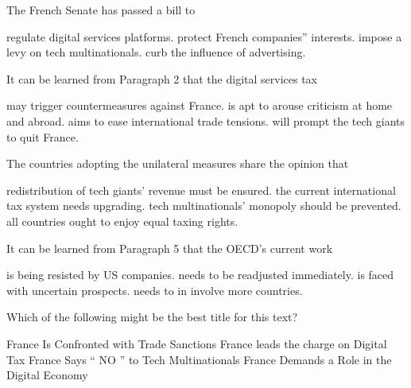 \item The French Senate has passed a bill to
\begin{tasks}
	\task regulate digital services platforms.
	\task protect French companies'' interests.
	\task impose a levy on tech multinationals.
	\task curb the influence of advertising.
\end{tasks}
\item It can be learned from Paragraph 2 that the digital services tax
\begin{tasks}
	\task may trigger countermeasures against France.
	\task is apt to arouse criticism at home and abroad.
	\task aims to ease international trade tensions.
	\task will prompt the tech giants to quit France.
\end{tasks}
\item The countries adopting the unilateral measures share the opinion that
\begin{tasks}
	\task redistribution of tech giants' revenue must be ensured.
	\task the current international tax system needs upgrading.
	\task tech multinationals' monopoly should be prevented.
	\task all countries ought to enjoy equal taxing rights.
\end{tasks}
\item It can be learned from Paragraph 5 that the OECD's current work
\begin{tasks}
	\task is being resisted  by  US  companies.
	\task needs to be readjusted immediately.
	\task is faced with uncertain prospects.
	\task needs to in involve more countries.
\end{tasks}
\item Which of the following might be the best title for this text?
\begin{tasks}
	\task France Is Confronted with Trade Sanctions
	\task France leads the charge on Digital Tax
	\task France Says `` NO '' to Tech Multinationals
	\task France Demands a Role in the Digital Economy
\end{tasks}